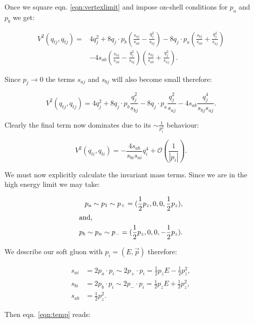 			Once we square eqn. \eqref{eqn:vertexlimit} and impose on-shell conditions for $p_a$ and $p_b$ we get:

			\begin{align}
				V^2(q_{tj}, q_{tj}) = &4q_j^2 + 8 q_j\cdot p_b \left(\frac{s_{aj}}{s_{ab}} - \frac{q^2_{j}}{s_{bj}}\right) -
					8q_j\cdot p_a \left(\frac{s_{bj}}{s_{ab}} + \frac{q_j^2}{s_{aj}}\right) \\ &- 4s_{ab}\left(\frac{s_{aj}}{s_{ab}} -
					\frac{q^2_{j}}{s_{bj}}\right)\left(\frac{s_{bj}}{s_{ab}} + \frac{q_j^2}{s_{aj}}\right).
			\end{align}

			Since $p_j\rightarrow0$ the terms $s_{aj}$ and $s_{bj}$ will also become small therefore:

			\begin{equation}
				V^2(q_{tj}, q_{tj}) = 4q_j^2 + 8 q_j\cdot p_b \frac{q^2_{j}}{s_{bj}} - 8 q_j\cdot p_a \frac{q_j^2}{s_{aj}} -
					4s_{ab}\frac{q^4_{j}}{s_{bj}s_{aj}}.
			\end{equation}

			Clearly the final term now dominates due to its $\sim\frac{1}{p_i^2}$ behaviour:

			\begin{equation}
				V^2(q_{ti}, q_{ti}) = - \frac{4s_{ab}}{s_{bi}s_{ai}}q^4_{i} + \mathcal{O}\left(\frac{1}{|p_i|}\right).
				\label{eqn:temp}
			\end{equation}

			We must now explicitly calculate the invariant mass terms.  Since we are in the high energy limit we may take:

			\begin{align}
				p_a\sim p_1 \sim p_+ = (\frac12 p_z, 0, 0, \frac12 p_z),\\
				\intertext{and,}
				p_b\sim p_n \sim p_- = (\frac12 p_z, 0, 0, -\frac12 p_z).
			\end{align}

			We describe our soft gluon with $p_i=(E, \vec{p})$ therefore:

			\begin{align}
				s_{ai} &= 2p_a\cdot p_i\sim2p_+\cdot p_i = \frac12p_zE - \frac12p_z^2,\\
				s_{bi} &= 2p_b\cdot p_i\sim2p_-\cdot p_i = \frac12p_zE + \frac12p_z^2,\\
				s_{ab} &= \frac12p_z^2.
			\end{align}

			Then eqn. \eqref{eqn:temp} reads:

